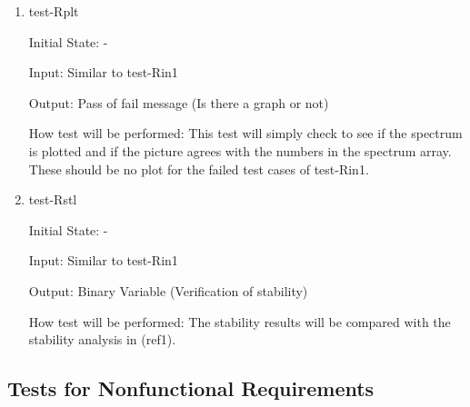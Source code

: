 \documentclass[12pt, titlepage]{article}
\begin{document}
\begin{enumerate}
\item{test-Rplt} 

Initial State: -

Input: Similar to test-Rin1 

Output: Pass of fail message (Is there a graph or not)

How test will be performed: This test will simply check to see if the spectrum 
is plotted and if the picture agrees with the numbers in the spectrum array. 
These should be no plot for the failed test cases of test-Rin1. 

\item{test-Rstl} 

Initial State: -

Input: Similar to test-Rin1 

Output: Binary Variable (Verification of stability) 

How test will be performed: The stability results will be compared with the 
stability analysis in (ref1). 

\end{enumerate}

\subsection{Tests for Nonfunctional Requirements}
\end{document}
